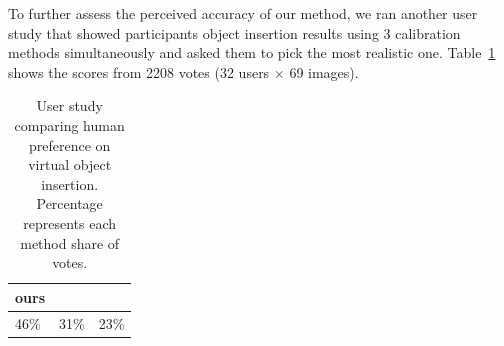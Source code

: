 To further assess the perceived accuracy of our method, we ran another user study that showed participants object insertion results using 3 calibration methods simultaneously and asked them to pick the most realistic one. Table~\ref{tab:user_comparison} shows the scores from 2208 votes (32 users $\times$ 69 images).

\begin{table}[!h]
\centering
\vspace{-0.5em}
\begin{tabular}{lll}
\toprule
ours & \cite{Workman2016} & \cite{Lee2014} \\
\midrule
46\% & 31\% & 23\% \\
\bottomrule
\end{tabular}
\vspace{0.5em}
\caption{User study comparing human preference on virtual object insertion. Percentage represents each method share of votes.}
\label{tab:user_comparison}
\end{table}
